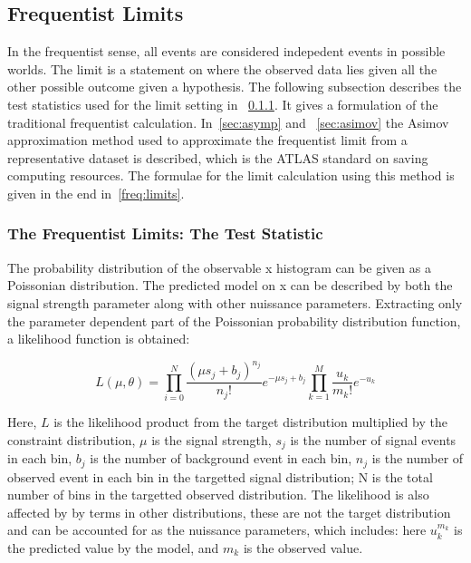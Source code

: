 \subsection{Frequentist Limits}
\label{sec:freq}
In the frequentist sense, all events are considered indepedent events in possible worlds. The limit is a statement on where the observed data lies given all the other possible outcome given a hypothesis. 
The following subsection describes the test statistics used for the limit setting in ~\ref{sec:freqTestStats}. It gives a formulation of the traditional frequentist calculation. In~\ref{sec:asymp} and ~\ref{sec:asimov} the Asimov approximation method used to approximate the frequentist limit from a representative dataset is described, which is the ATLAS standard on saving computing resources. The formulae for the limit calculation using this method is given in the end in~\ref{freq:limits}.

\subsubsection{The Frequentist Limits: The Test Statistic}
\label{sec:freqTestStats}

The probability distribution of the observable x histogram can be given as a Poissonian distribution. The predicted model on x can be described by both the signal strength parameter along with other nuissance parameters. Extracting only the parameter dependent part of the Poissonian probability distribution function, a likelihood function is obtained:

\begin{equation}
    L(\mu, \theta) =  \prod_{i=0}^{N} \frac{(\mu s_{j} + b_{j})^{n_j}}{n_{j}!}e^{-\mu s_j + b_j} \prod_{k=1}^{M}\frac{u_{k}}
{m_{k}!} e^{-u_{k}}
\label{eq:likelihood}
\end{equation}

Here, $L$ is the likelihood product from the target distribution multiplied by the constraint distribution, $\mu$ is the signal strength, $s_j$ is the number of signal events in each bin, $b_j$ is the number of background event in each bin, $n_j$ is the number of observed event in each bin in the targetted signal distribution; N is the total number of bins in the targetted observed distribution. The likelihood is also affected by by terms in other distributions, these
are not the target distribution and can be accounted for as the nuissance parameters, which
includes:
here $u_k^{m_k}$ is the predicted value by the model, and $m_{k}$ is the observed value. 

